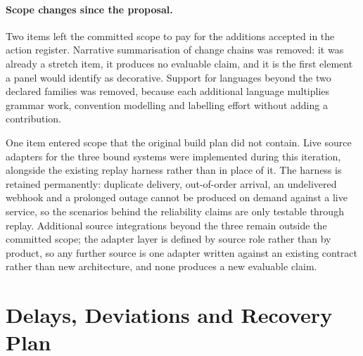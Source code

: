 \paragraph{Scope changes since the proposal.} Two items left the committed
scope to pay for the additions accepted in the action register. Narrative
summarisation of change chains was removed: it was already a stretch item, it
produces no evaluable claim, and it is the first element a panel would identify
as decorative. Support for languages beyond the two declared families was
removed, because each additional language multiplies grammar work, convention
modelling and labelling effort without adding a contribution.

One item entered scope that the original build plan did not contain. Live
source adapters for the three bound systems were implemented during this
iteration, alongside the existing replay harness rather than in place of it.
The harness is retained permanently: duplicate delivery, out-of-order arrival,
an undelivered webhook and a prolonged outage cannot be produced on demand
against a live service, so the scenarios behind the reliability claims are only
testable through replay. Additional source integrations beyond the three remain
outside the committed scope; the adapter layer is defined by source role rather
than by product, so any further source is one adapter written against an
existing contract rather than new architecture, and none produces a new
evaluable claim.

\section{Delays, Deviations and Recovery Plan}


